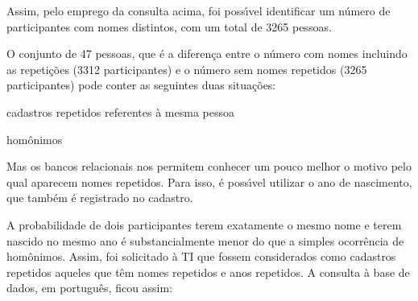 \documentclass[
12pt,		%
openright,	%
twoside,  %
a4paper,			%
chapter=TITLE,		%
english,			%
french,				%
spanish,			%
brazil				%
]{USPSC-classe/USPSC_RedarTex}
\begin{document}
\noindent\begin{center}\mbox{\centering{}}\end{center}











Assim, pelo emprego da consulta acima, foi poss\'{\i}vel identificar um n\'umero de participantes com nomes distintos, com um total de 3265 pessoas.








O conjunto de 47 pessoas, que \'e a diferen\c{c}a entre o n\'umero com nomes incluindo as repeti\c{c}\~oes (3312 participantes) e o n\'umero sem nomes repetidos (3265 participantes) pode conter as seguintes duas situa\c{c}\~oes:









\begin{alineas}
\item cadastros repetidos referentes \`a mesma pessoa
\item hom\^onimos
\end{alineas}

Mas os bancos relacionais nos permitem conhecer um pouco melhor o motivo pelo qual aparecem nomes repetidos. Para isso, \'e poss\'{\i}vel utilizar o ano de nascimento, que tamb\'em \'e registrado no cadastro.








A probabilidade de dois participantes terem exatamente o mesmo nome e terem nascido no mesmo ano \'e substancialmente menor do que a simples ocorr\^encia de hom\^onimos. Assim, foi solicitado \`a TI que fossem considerados como cadastros repetidos aqueles que t\^em nomes repetidos e anos repetidos. A consulta \`a base de dados, em portugu\^es, ficou assim:









\noindent\begin{center}\mbox{\centering{}}\end{center}
\end{document}
